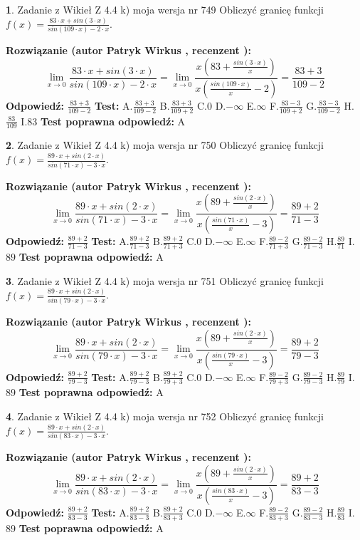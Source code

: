 \documentclass[12pt, a4paper]{article}
\theoremstyle{definition} %
\newtheorem{zad}{}
\newcommand{\zadStart}[1]{\begin{zad}#1\newline}
\newcommand{\zadStop}{\end{zad}}
\newcommand{\rozwStart}[2]{\noindent \textbf{Rozwiązanie (autor #1 , recenzent #2): }\newline}
\newcommand{\rozwStop}{\newline}
\newcommand{\odpStart}{\noindent \textbf{Odpowiedź:}\newline}
\newcommand{\odpStop}{\newline}
\newcommand{\testStart}{\noindent \textbf{Test:}\newline}
\newcommand{\testStop}{\newline}
\newcommand{\kluczStart}{\noindent \textbf{Test poprawna odpowiedź:}\newline}
\newcommand{\kluczStop}{\newline}
\begin{document}
\zadStart{Zadanie z Wikieł Z 4.4 k) moja wersja nr 749}
Obliczyć granicę funkcji $f(x)=\frac{83\cdot x +sin(3\cdot x)}{sin(109\cdot x) -2\cdot x}$.
\zadStop
\rozwStart{Patryk Wirkus}{}
$$\lim\limits_{x\to 0}\frac{83\cdot x +sin(3\cdot x)}{sin(109\cdot x) -2\cdot x}
=\lim\limits_{x\to 0}\frac{x(83+\frac{sin(3\cdot x)}{x})}{x(\frac{sin(109\cdot x)}{x}-2)}
=\frac{83+3}{109-2}$$
\rozwStop
\odpStart
$\frac{83+3}{109-2}$
\odpStop
\testStart
A.$\frac{83+3}{109-2}$
B.$\frac{83+3}{109+2}$
C.$0$
D.$-\infty$
E.$\infty$
F.$\frac{83-3}{109+2}$
G.$\frac{83-3}{109-2}$
H.$\frac{83}{109}$
I.$83$
\testStop
\kluczStart
A
\kluczStop



\zadStart{Zadanie z Wikieł Z 4.4 k) moja wersja nr 750}
Obliczyć granicę funkcji $f(x)=\frac{89\cdot x +sin(2\cdot x)}{sin(71\cdot x) -3\cdot x}$.
\zadStop
\rozwStart{Patryk Wirkus}{}
$$\lim\limits_{x\to 0}\frac{89\cdot x +sin(2\cdot x)}{sin(71\cdot x) -3\cdot x}
=\lim\limits_{x\to 0}\frac{x(89+\frac{sin(2\cdot x)}{x})}{x(\frac{sin(71\cdot x)}{x}-3)}
=\frac{89+2}{71-3}$$
\rozwStop
\odpStart
$\frac{89+2}{71-3}$
\odpStop
\testStart
A.$\frac{89+2}{71-3}$
B.$\frac{89+2}{71+3}$
C.$0$
D.$-\infty$
E.$\infty$
F.$\frac{89-2}{71+3}$
G.$\frac{89-2}{71-3}$
H.$\frac{89}{71}$
I.$89$
\testStop
\kluczStart
A
\kluczStop



\zadStart{Zadanie z Wikieł Z 4.4 k) moja wersja nr 751}
Obliczyć granicę funkcji $f(x)=\frac{89\cdot x +sin(2\cdot x)}{sin(79\cdot x) -3\cdot x}$.
\zadStop
\rozwStart{Patryk Wirkus}{}
$$\lim\limits_{x\to 0}\frac{89\cdot x +sin(2\cdot x)}{sin(79\cdot x) -3\cdot x}
=\lim\limits_{x\to 0}\frac{x(89+\frac{sin(2\cdot x)}{x})}{x(\frac{sin(79\cdot x)}{x}-3)}
=\frac{89+2}{79-3}$$
\rozwStop
\odpStart
$\frac{89+2}{79-3}$
\odpStop
\testStart
A.$\frac{89+2}{79-3}$
B.$\frac{89+2}{79+3}$
C.$0$
D.$-\infty$
E.$\infty$
F.$\frac{89-2}{79+3}$
G.$\frac{89-2}{79-3}$
H.$\frac{89}{79}$
I.$89$
\testStop
\kluczStart
A
\kluczStop



\zadStart{Zadanie z Wikieł Z 4.4 k) moja wersja nr 752}
Obliczyć granicę funkcji $f(x)=\frac{89\cdot x +sin(2\cdot x)}{sin(83\cdot x) -3\cdot x}$.
\zadStop
\rozwStart{Patryk Wirkus}{}
$$\lim\limits_{x\to 0}\frac{89\cdot x +sin(2\cdot x)}{sin(83\cdot x) -3\cdot x}
=\lim\limits_{x\to 0}\frac{x(89+\frac{sin(2\cdot x)}{x})}{x(\frac{sin(83\cdot x)}{x}-3)}
=\frac{89+2}{83-3}$$
\rozwStop
\odpStart
$\frac{89+2}{83-3}$
\odpStop
\testStart
A.$\frac{89+2}{83-3}$
B.$\frac{89+2}{83+3}$
C.$0$
D.$-\infty$
E.$\infty$
F.$\frac{89-2}{83+3}$
G.$\frac{89-2}{83-3}$
H.$\frac{89}{83}$
I.$89$
\testStop
\kluczStart
A
\kluczStop
\end{document}
